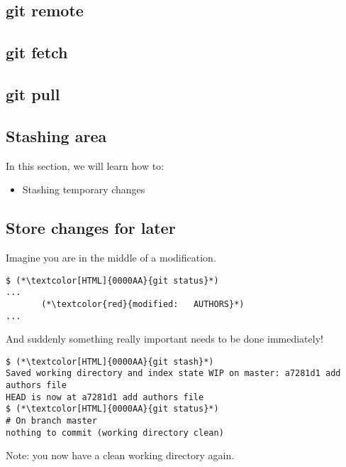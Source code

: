 \subsection{git remote}
\begin{frame}[fragile]
  \subslidetitle
\end{frame}

\subsection{git fetch}
\begin{frame}[fragile]
    \subslidetitle
\end{frame}

\subsection{git pull}
\begin{frame}[fragile]
    \subslidetitle
\end{frame}

\subsection{Stashing area}
\begin{frame}[fragile]
  \slidetitle

  In this section, we will learn how to:
  \begin{itemize}
    \item Stashing temporary changes
  \end{itemize}
\end{frame}


\subsection{Store changes for later}
\begin{frame}[fragile]
\subslidetitle

Imagine you are in the middle of a modification.

\begin{lstlisting}
$ (*\textcolor[HTML]{0000AA}{git status}*)
...
       (*\textcolor{red}{modified:   AUTHORS}*)
...
\end{lstlisting}

And suddenly something really important needs to be done immediately!

\begin{lstlisting}
$ (*\textcolor[HTML]{0000AA}{git stash}*)
Saved working directory and index state WIP on master: a7281d1 add authors file
HEAD is now at a7281d1 add authors file
$ (*\textcolor[HTML]{0000AA}{git status}*)
# On branch master
nothing to commit (working directory clean)
\end{lstlisting}
Note: you now have a clean working directory again.
\end{frame}


